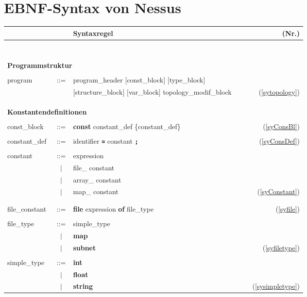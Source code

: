 \chapter{EBNF-Syntax von {\bf Nessus}}
\label{Syntax}
 
\small

                     
\begin{tabular}{lclr}
  && Syntaxregel & ~~~(Nr.)\\
  \hline\\
\multicolumn{4}{l}{\large ~~~~~~~~~~~~~~~~~~~~~~~~~~~~~~~~~~~~~~~~~~~~~~~~~~~~~~~~~~~~~~~~~~~~~~~~~~~~~~~~~~~~~~} \\ 
& & & \\ 
& & & \\
\multicolumn{4}{l}{\large {\bf Programmstruktur}}  \\
& & & \\
  program  & ::= & program\_header $[$const\_block$]$ $[$type\_block$]$\\
          &    & $[$structure\_block$]$ $[$var\_block$]$ topology\_modif\_block  & (\ref{sytopology}) \\ 
& & & \\
& & & \\
& & & \\
\multicolumn{4}{l}{\large {\bf Konstantendefinitionen}}\index{Konstantendefinition!Syntax}  \\
& & & \\
  const\_block  & ::= & {\bf const}\index{cons} constant\_def \{constant\_def\} & (\ref{syConsBl}) \\
& & & \\
  constant\_def  & ::= & identifier {\bf \verb&=&} constant {\bf \verb&;&} & (\ref{syConsDef})\\
& & & \\
  constant  & ::= & expression \\
                         & $|$ & file\_ constant \\
                         & $|$ & array\_ constant \\
                         & $|$ & map\_ constant& (\ref{syConstant})\\  \index{Relation!Definition}
& & & \\
& & & \\
  file\_constant  & ::= & {\bf file}\index{file} expression {\bf of}\index{of} file\_type& (\ref{syfile})\\
& & & \\
  file\_type  & ::= & simple\_type\\
                        &$|$& {\bf map}\index{map} \\
                        &$|$& {\bf subnet}&\index{subnet} (\ref{syfiletype})\\

& & & \\
  simple\_type  & ::= & {\bf int}\\\index{int}
		        &$|$& {\bf float}\\\index{float}
	    	        &$|$& {\bf string}&\index{string} (\ref{sysimpletype})\\ 
\end{tabular}

